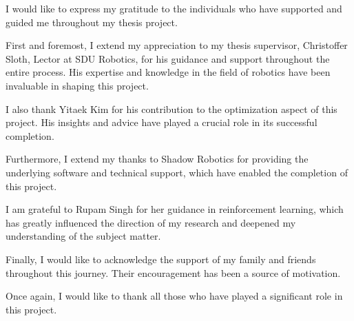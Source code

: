 


I would like to express my gratitude to the individuals who have supported and guided me throughout my thesis project. \medskip

First and foremost, I extend my appreciation to my thesis supervisor, Christoffer Sloth, Lector at SDU Robotics, for his guidance and support throughout the entire process. His expertise and knowledge in the field of robotics have been invaluable in shaping this project. \medskip

I also thank Yitaek Kim for his contribution to the optimization aspect of this project. His insights and advice have played a crucial role in its successful completion. \medskip

Furthermore, I extend my thanks to Shadow Robotics for providing the underlying software and technical support, which have enabled the completion of this project. \medskip

I am grateful to Rupam Singh for her guidance in reinforcement learning, which has greatly influenced the direction of my research and deepened my understanding of the subject matter. \medskip

Finally, I would like to acknowledge the support of my family and friends throughout this journey. Their encouragement has been a source of motivation. \medskip

Once again, I would like to thank all those who have played a significant role in this project.